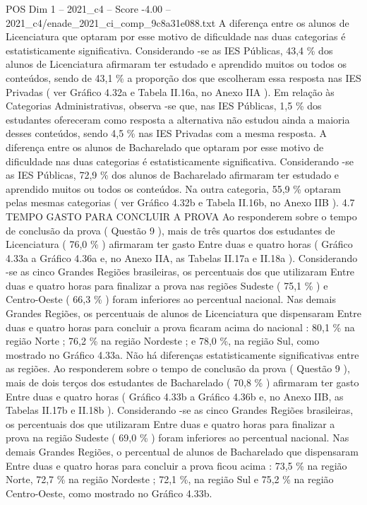 \begin{textsample}{POS Dim 1 – 2021\_c4 – Score -4.00 – 2021\_c4/enade\_2021\_ci\_comp\_9c8a31e088.txt}
A diferença entre os alunos de Licenciatura que optaram por esse motivo de dificuldade nas duas categorias é estatisticamente significativa.
Considerando -se as IES Públicas, 43,4 \% dos alunos de Licenciatura afirmaram ter estudado e aprendido muitos ou todos os conteúdos, sendo de 43,1 \% a proporção dos que escolheram essa resposta nas IES Privadas ( ver Gráfico 4.32a e Tabela II.16a, no Anexo IIA ).
Em relação às Categorias Administrativas, observa -se que, nas IES Públicas, 1,5 \% dos estudantes ofereceram como resposta a alternativa não estudou ainda a maioria desses conteúdos, sendo 4,5 \% nas IES Privadas com a mesma resposta.
A diferença entre os alunos de Bacharelado que optaram por esse motivo de dificuldade nas duas categorias é estatisticamente significativa.
Considerando -se as IES Públicas, 72,9 \% dos alunos de Bacharelado afirmaram ter estudado e aprendido muitos ou todos os conteúdos.
Na outra categoria, 55,9 \% optaram pelas mesmas categorias ( ver Gráfico 4.32b e Tabela II.16b, no Anexo IIB ). 4.7 TEMPO GASTO PARA CONCLUIR A PROVA Ao responderem sobre o tempo de conclusão da prova ( Questão 9 ), mais de três quartos dos estudantes de Licenciatura ( 76,0 \% ) afirmaram ter gasto Entre duas e quatro horas ( Gráfico 4.33a a Gráfico 4.36a e, no Anexo IIA, as Tabelas II.17a e II.18a ).
Considerando -se as cinco Grandes Regiões brasileiras, os percentuais dos que utilizaram Entre duas e quatro horas para finalizar a prova nas regiões Sudeste ( 75,1 \% ) e Centro-Oeste ( 66,3 \% ) foram inferiores ao percentual nacional.
Nas demais Grandes Regiões, os percentuais de alunos de Licenciatura que dispensaram Entre duas e quatro horas para concluir a prova ficaram acima do nacional : 80,1 \% na região Norte ; 76,2 \% na região Nordeste ; e 78,0 \%, na região Sul, como mostrado no Gráfico 4.33a.
Não há diferenças estatisticamente significativas entre as regiões.
Ao responderem sobre o tempo de conclusão da prova ( Questão 9 ), mais de dois terços dos estudantes de Bacharelado ( 70,8 \% ) afirmaram ter gasto Entre duas e quatro horas ( Gráfico 4.33b a Gráfico 4.36b e, no Anexo IIB, as Tabelas II.17b e II.18b ).
Considerando -se as cinco Grandes Regiões brasileiras, os percentuais dos que utilizaram Entre duas e quatro horas para finalizar a prova na região Sudeste ( 69,0 \% ) foram inferiores ao percentual nacional.
Nas demais Grandes Regiões, o percentual de alunos de Bacharelado que dispensaram Entre duas e quatro horas para concluir a prova ficou acima : 73,5 \% na região Norte, 72,7 \% na região Nordeste ; 72,1 \%, na região Sul e 75,2 \% na região Centro-Oeste, como mostrado no Gráfico 4.33b.

\end{textsample}
